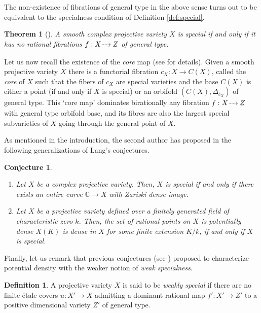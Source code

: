 \documentclass[JEP,XML,SOM,Unicode, NoEqCountersInSection,NoFloatCountersInSection,published]{cedram}
\newcommand{\dradpl}{{\hspace*{-2.5mm}\begin{tikzcd}[ampersand replacement=\&,column sep = scriptsize]\mbox{}\ar[r,dashed]\&\mbox{}\end{tikzcd}\hspace*{-2.5mm}}}
\newcommand{\dratst}{{\hspace*{-2.5mm}\begin{tikzcd}[ampersand replacement=\&,column sep = small]\mbox{}\ar[r,dashed]\&\mbox{}\end{tikzcd}\hspace*{-2mm}}}
\let\drascst\dratst
\newcommand{\dra}{\mathchoice{\dradpl}{\dratst}{\drascst}{\drascst}}
\let\dasharrow\dra
\theoremstyle{theorem}
\newtheorem{theorem}{Theorem}
\newtheorem{conjecture}[proposition]{Conjecture}
\theoremstyle{definition}
\newtheorem{definition}[proposition]{Definition}
\def\bC{{\mathbb C}}
\begin{document}
The non-existence of fibrations of general type in the above sense turns out to be equivalent to the specialness condition of Definition \ref{def:special}.

\begin{theorem}[]
A smooth complex projective variety \(X\) is special if and only if it has no rational fibrations $f:X\dasharrow Z$ of general type.
\end{theorem}

Let us now recall the existence of the \emph{core} map (see \cite[\S 3]{Cam04} for details). Given a smooth projective variety $X$ there is a functorial fibration $c_X: X \to C(X)$, called the \emph{core} of $X$ such that the fibers of $c_X$ are special varieties and the base $C(X)$ is either a point (if and only if $X$ is special) or an orbifold $(C(X),\Delta_{c_X})$ of general type. This `core map' dominates birationally any fibration $f:X\dasharrow Z$ with general type orbifold base, and its fibres are also the largest special subvarieties of $X$ going through the general point of $X$.

As mentioned in the introduction, the second author has proposed in \cite{Cam04} the following generalizations of Lang's conjectures.

\skpt
\begin{conjecture}\label{specialconj}
\begin{enumerate}
\item Let $X$ be a complex projective variety. Then, $X$ is special if and only if there exists an entire curve $\bC \to X$ with Zariski dense image.
\item Let $X$ be a projective variety defined over a finitely generated field of characteristic zero \(k\).
Then, the set of rational points on $X$ is potentially dense \ie \(X(K)\) is dense in \(X\) for some finite extension \(K/k\), if and only if $X$ is special.
\end{enumerate}
\end{conjecture}

Finally, let us remark that previous conjectures (see \cite[Conj.\,1.2]{HaT}) proposed to characterize potential density with the weaker notion of \emph{weak specialness}.

\begin{definition}
A projective variety \(X\) is said to be \emph{weakly special} if there are no finite étale covers \(u\colon X'\to X\) admitting a dominant rational map \(f'\colon X'\to Z'\) to a positive dimensional variety $Z'$ of general type.
\end{definition}
\end{document}
